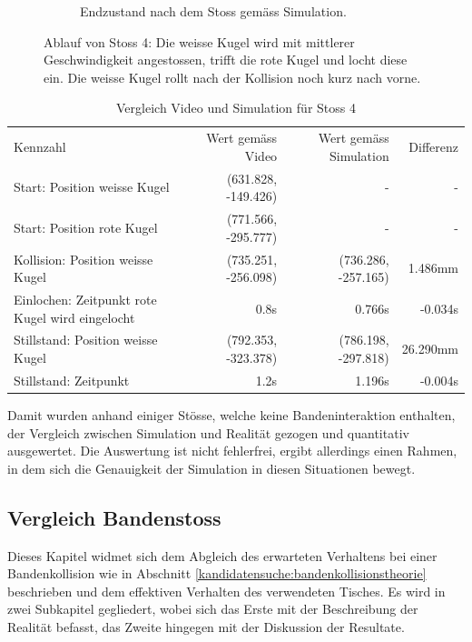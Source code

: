 \begin{figure}[h!]
\begin{subfigure}[t]{0.2\textwidth}
        \caption{Endzustand nach dem Stoss gemäss Simulation.}
        \label{fig:video_13_0030_0034_simulation}
    \end{subfigure}
    \caption{
        Ablauf von Stoss 4: Die weisse Kugel wird mit mittlerer Geschwindigkeit angestossen, trifft die rote Kugel und locht diese ein.
        Die weisse Kugel rollt nach der Kollision noch kurz nach vorne.
    }
    \label{fig:video_13_0030_0034}
\end{figure}

\begin{table}[ht]
    \begin{tabular}{ lrrr }
        \rowcolor{\seccolor!50}
        Kennzahl & Wert gemäss Video & Wert gemäss Simulation & Differenz \\
        Start: Position weisse Kugel & (631.828, -149.426) & - & -\\
        Start: Position rote Kugel & (771.566, -295.777) & - & -\\
        Kollision: Position weisse Kugel & (735.251, -256.098) & (736.286, -257.165) & 1.486mm\\
        Einlochen: Zeitpunkt rote Kugel wird eingelocht & 0.8s & 0.766s & -0.034s\\
        Stillstand: Position weisse Kugel & (792.353, -323.378) & (786.198, -297.818) & 26.290mm\\
        Stillstand: Zeitpunkt & 1.2s & 1.196s & -0.004s\\
    \end{tabular}
    \caption{Vergleich Video und Simulation für Stoss 4}
    \label{tab:video_13_0030_0034}
\end{table}

Damit wurden anhand einiger Stösse, welche keine Bandeninteraktion enthalten,
der Vergleich zwischen Simulation und Realität gezogen und quantitativ ausgewertet.
Die Auswertung ist nicht fehlerfrei, ergibt allerdings einen Rahmen, in dem sich die Genauigkeit der Simulation in diesen
Situationen bewegt.

\newpage
\subsection{Vergleich Bandenstoss}\label{kap:vergleich_simulation_realitaet:vergleich_bandenstoss}
Dieses Kapitel widmet sich dem Abgleich des erwarteten Verhaltens bei einer Bandenkollision wie in
Abschnitt \ref{kandidatensuche:bandenkollisionstheorie} beschrieben und dem effektiven Verhalten des verwendeten Tisches.
Es wird in zwei Subkapitel gegliedert, wobei sich das Erste mit der Beschreibung der Realität befasst, das Zweite hingegen
mit der Diskussion der Resultate.

